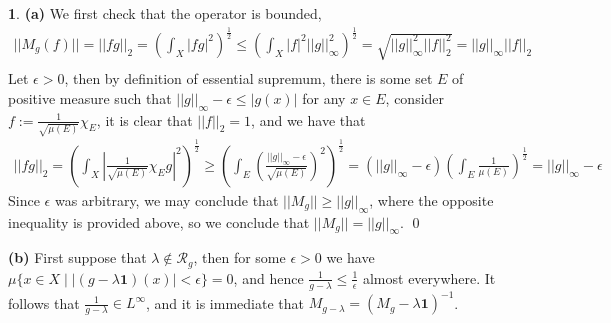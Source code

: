 \documentclass[11pt]{article}
\theoremstyle{definition}
\newtheorem{pb}{}
\newcommand{\set}[1]{\{#1\}}
\newcommand{\abs}[1]{\left\vert#1\right\vert}
\newcommand{\norm}[1]{\lvert\lvert#1\rvert\rvert}
\begin{document}
    \begin{pb}
        \textbf{(a)} We first check that the operator is bounded,
        \begin{align*}
            \norm{M_g(f)} = \norm{fg}_2 = \left(\int_X \abs{fg}^2\right)^{\frac12} \leq \left(\int_X \abs{f}^2\norm{g}^2_\infty\right)^{\frac12} = \sqrt{\norm{g}_\infty^2\norm{f}_2^2} = \norm{g}_\infty\norm{f}_2\\
        \end{align*}
        Let \(\epsilon > 0\), then by definition of essential supremum, there is some set \(E\) of positive measure such that \(\norm{g}_\infty - \epsilon \leq \abs{g(x)}\) for any \(x \in E\), consider \(f := \frac{1}{\sqrt{\mu(E)}}\chi_E\), it is clear that \(\norm{f}_2 = 1\), and we have that
        \begin{align*}
            \norm{fg}_2 = \left(\int_X \abs{\frac{1}{\sqrt{\mu(E)}}\chi_E g}^2\right)^{\frac12} \geq \left(\int_E\left(\frac{\norm{g}_\infty - \epsilon}{\sqrt{\mu(E)}}\right)^2 \right)^{\frac12} = (\norm{g}_\infty - \epsilon)\left(\int_E \frac{1}{\mu(E)}\right)^{\frac12} = \norm{g}_\infty - \epsilon
        \end{align*}
        Since \(\epsilon\) was arbitrary, we may conclude that \(\norm{M_g} \geq \norm{g}_\infty\), where the opposite inequality is provided above, so we conclude that \(\norm{M_g} = \norm{g}_\infty\). \qed

        \textbf{(b)} First suppose that \(\lambda \not \in \mathcal{R}_g\), then for some \(\epsilon > 0\) we have \(\mu\set{x \in X \mid \abs{(g - \lambda\mathbf{1})(x)} < \epsilon} = 0\), and hence \(\frac{1}{g - \lambda} \leq \frac{1}{\epsilon}\) almost everywhere. It follows that \(\frac{1}{g - \lambda} \in L^\infty\), and it is immediate that \(M_{g-\lambda} = (M_g - \lambda\mathbf{1})^{-1}\).


\end{pb}
\end{document}

